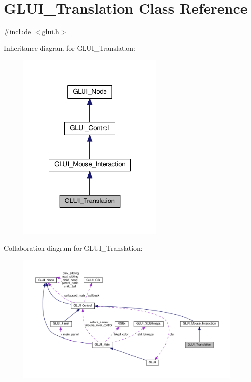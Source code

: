 \hypertarget{class_g_l_u_i___translation}{\section{G\+L\+U\+I\+\_\+\+Translation Class Reference}
\label{class_g_l_u_i___translation}
}


{\ttfamily \#include $<$glui.\+h$>$}



Inheritance diagram for G\+L\+U\+I\+\_\+\+Translation\+:\nopagebreak
\begin{figure}[H]
\begin{center}
\leavevmode
\includegraphics[width=204pt]{class_g_l_u_i___translation__inherit__graph}
\end{center}
\end{figure}


Collaboration diagram for G\+L\+U\+I\+\_\+\+Translation\+:\nopagebreak
\begin{figure}[H]
\begin{center}
\leavevmode
\includegraphics[width=350pt]{class_g_l_u_i___translation__coll__graph}
\end{center}
\end{figure}
